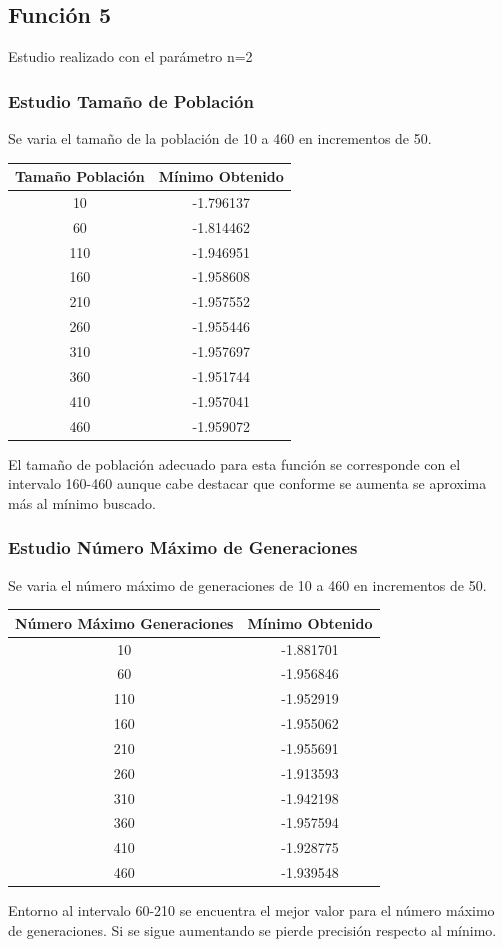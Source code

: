 \documentclass[12pt]{article}
\begin{document}
\subsection{Función 5}
	Estudio realizado con el parámetro n=2
\subsubsection*{Estudio Tamaño de Población}
	Se varia el tamaño de la población de 10 a 460 en incrementos de 50.
\begin{table}[H]
\begin{center}
\begin{tabular}{|cc|} \hline
Tamaño Población & Mínimo Obtenido \\  \hline
10  & -1.796137 \\ 
60  & -1.814462 \\ 
110 & -1.946951 \\
160 & -1.958608 \\
210 & -1.957552 \\
260 & -1.955446 \\
310 & -1.957697 \\
360 & -1.951744 \\ 
410 & -1.957041 \\
460 & -1.959072 \\  \hline
\end{tabular}
\end{center}
\end{table}
	El tamaño de población adecuado para esta función se corresponde con el intervalo 160-460 aunque cabe destacar que conforme se aumenta se aproxima más al mínimo buscado.	 

\subsubsection*{Estudio Número Máximo de Generaciones}
	Se varia el número máximo de generaciones de 10 a 460 en incrementos de 50.
\begin{table}[H]
\begin{center}
\begin{tabular}{|cc|} \hline
Número Máximo Generaciones & Mínimo Obtenido \\  \hline
10  & -1.881701 \\ 
60  & -1.956846 \\ 
110 & -1.952919 \\
160 & -1.955062 \\
210 & -1.955691 \\
260 & -1.913593 \\
310 & -1.942198 \\
360 & -1.957594 \\ 
410 & -1.928775 \\
460 & -1.939548 \\  \hline
\end{tabular}
\end{center}
\end{table}
	Entorno al intervalo 60-210 se encuentra el mejor valor para el número máximo de generaciones. Si se sigue aumentando se pierde precisión respecto al mínimo.
\end{document}
